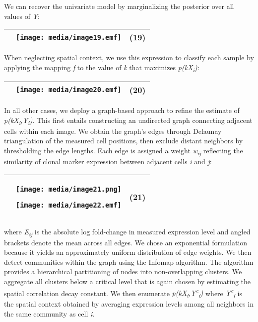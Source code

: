 We can recover the univariate model by marginalizing the posterior over all values of \emph{Y}:

\begin{longtable}[]{@{}lll@{}}
\toprule
& \texttt{[image: media/image19.emf]} & (19)\tabularnewline
\bottomrule
\end{longtable}

When neglecting spatial context, we use this expression to classify each sample by applying the mapping \emph{f} to the value of \emph{k} that maximizes \emph{p(k\textbar{}X\textsubscript{i})}:

\begin{longtable}[]{@{}lll@{}}
\toprule
& \texttt{[image: media/image20.emf]} & (20)\tabularnewline
\bottomrule
\end{longtable}

In all other cases, we deploy a graph-based approach to refine the estimate of \emph{p(k\textbar{}X\textsubscript{i},Y\textsubscript{i})}. This first entails constructing an undirected graph connecting adjacent cells within each image. We obtain the graph's edges through Delaunay triangulation of the measured cell positions, then exclude distant neighbors by thresholding the edge lengths. Each edge is assigned a weight \emph{w\textsubscript{ij}} reflecting the similarity of clonal marker expression between adjacent cells \emph{i} and \emph{j}:

\begin{longtable}[]{@{}lll@{}}
\toprule
\begin{minipage}[t]{0.32\columnwidth}\raggedright\strut
\strut
\end{minipage} & \begin{minipage}[t]{0.32\columnwidth}\raggedright\strut
\texttt{[image: media/image21.png]}

\texttt{[image: media/image22.emf]}\strut
\end{minipage} & \begin{minipage}[t]{0.32\columnwidth}\raggedright\strut
(21)\strut
\end{minipage}\tabularnewline
\bottomrule
\end{longtable}

where \emph{E\textsubscript{ij}} is the absolute log fold-change in measured expression level and angled brackets denote the mean across all edges. We chose an exponential formulation because it yields an approximately uniform distribution of edge weights. We then detect communities within the graph using the Infomap algorithm. The algorithm provides a hierarchical partitioning of nodes into non-overlapping clusters. We aggregate all clusters below a critical level that is again chosen by estimating the spatial correlation decay constant. We then enumerate \emph{p(k\textbar{}X\textsubscript{i},Y\textsuperscript{c}\textsubscript{i})} where \emph{Y\textsuperscript{c}\textsubscript{i}} is the spatial context obtained by averaging expression levels among all neighbors in the same community as cell \emph{i}.

